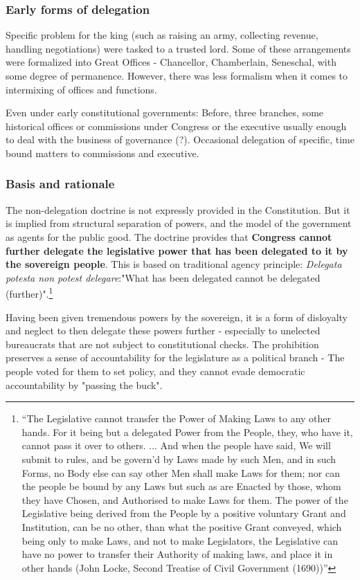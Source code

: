\documentclass[../main.tex]{subfiles}
\begin{document}
\subsubsection{Early forms of delegation} Specific problem for the king (such as raising an army, collecting revenue, handling negotiations) were tasked to a trusted lord. Some of these arrangements were formalized into Great Offices - Chancellor, Chamberlain, Seneschal, with some degree of permanence. However, there was less formalism when it comes to intermixing of offices and functions. 

Even under early constitutional governments: Before, three branches, some historical offices or commissions under Congress or the executive usually enough to deal with the business of governance (?). Occasional delegation of specific, time bound matters to commissions and executive.

\subsubsection{Basis and rationale} The non-delegation doctrine is not expressly provided in the Constitution. But it is implied from structural separation of powers, and the model of the government as agents for the public good. The doctrine provides that \textbf{Congress cannot further delegate the legislative power that has been delegated to it by the sovereign people}. This is based on traditional agency principle: \textit{Delegata potesta non potest delegare}:"What has been delegated cannot be delegated (further)".\footnote{\enquote{The Legislative cannot transfer the Power of Making Laws to any other hands. For it being but a delegated Power from the People, they, who have it, cannot pass it over to others. ... And when the people have said, We will submit to rules, and be govern'd by Laws made by such Men, and in such Forms, no Body else can say other Men shall make Laws for them; nor can the people be bound by any Laws but such as are Enacted by those, whom they have Chosen, and Authorised to make Laws for them. The power of the Legislative being derived from the People by a positive voluntary Grant and Institution, can be no other, than what the positive Grant conveyed, which being only to make Laws, and not to make Legislators, the Legislative can have no power to transfer their Authority of making laws, and place it in other hands (John Locke, Second Treatise of Civil Government (1690))}}

Having been given tremendous powers by the sovereign, it is a form of disloyalty and neglect to then delegate these powers further - especially to unelected bureaucrats that are not subject to constitutional checks. The prohibition preserves a sense of accountability for the legislature as a political branch - The people voted for them to set policy, and they cannot evade democratic accountability by "passing the buck".
\end{document}
